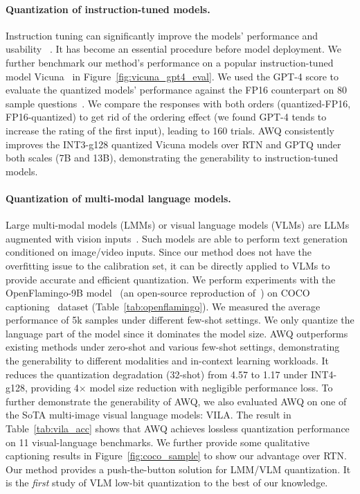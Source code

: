 \paragraph{Quantization of instruction-tuned models.} Instruction tuning can significantly improve the models' performance and usability ~\cite{wei2021finetuned,sanh2021multitask,ouyang2022training,chung2022scaling}. It has become an essential procedure before model deployment. We further benchmark our method's performance on a popular instruction-tuned model Vicuna~\cite{vicuna2023} in Figure~\ref{fig:vicuna_gpt4_eval}. We used the GPT-4 score to evaluate the quantized models' performance against the FP16 counterpart on 80 sample questions~\cite{vicuna2023}. We compare the responses with both orders (quantized-FP16, FP16-quantized) to get rid of the ordering effect (we found GPT-4 tends to increase the rating of the first input), leading to 160 trials. AWQ consistently improves the INT3-g128 quantized Vicuna models over RTN and GPTQ under both scales (7B and 13B), demonstrating the generability to instruction-tuned models.  

\paragraph{Quantization of multi-modal language models.} Large multi-modal models (LMMs) or visual language models (VLMs) are LLMs augmented with vision inputs~\cite{alayrac2022flamingo,li2023blip,koh2023grounding,driess2023palm,zhang2023llama,liu2023llava}. Such models are able to perform text generation conditioned on image/video inputs. Since our method does not have the overfitting issue to the calibration set, it can be directly applied to VLMs to provide accurate and efficient quantization. We perform experiments with the OpenFlamingo-9B model~\cite{openflamingo} (an open-source reproduction of~\cite{alayrac2022flamingo}) on COCO captioning~\cite{chen2015microsoft} dataset (Table~\ref{tab:openflamingo}). We measured the average performance of 5k samples under different few-shot settings. We only quantize the language part of the model since it dominates the model size. AWQ outperforms existing methods under zero-shot and various few-shot settings, demonstrating the generability to different modalities and in-context learning workloads. It reduces the quantization degradation (32-shot) from 4.57 to 1.17 under INT4-g128, providing 4$\times$ model size reduction with negligible performance loss. To further demonstrate the generability of AWQ, we also evaluated AWQ on one of the SoTA multi-image visual language models: VILA. The result in Table~\ref{tab:vila_acc} shows that AWQ achieves lossless quantization performance on 11 visual-language benchmarks. We further provide some qualitative captioning results in Figure~\ref{fig:coco_sample} to show our advantage over RTN. Our method provides a push-the-button solution for LMM/VLM quantization. It is the \emph{first} study of VLM low-bit quantization to the best of our knowledge.


